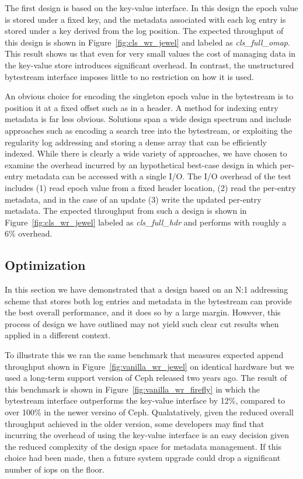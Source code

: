 \documentclass[10pt,twocolumn]{article}
\begin{document}
The first design is based on the key-value interface. In this design the epoch
value is stored under a fixed key, and the metadata associated with each log
entry is stored under a key derived from the log position. The expected throughput of
this design is shown in Figure~\ref{fig:cls_wr_jewel} and labeled as
\emph{cls\_full\_omap}. This result shows us that even for very small values
the cost of managing data in the key-value store introduces significant
overhead. In contrast, the unstructured bytestream interface imposes little
to no restriction on how it is used.

An obvious choice for encoding the singleton epoch value in the bytestream is
to position it at a fixed offset such as in a header. A method for indexing
entry metadata is far less obvious. Solutions span a wide design spectrum and
include approaches such as encoding a search tree into the bytestream, or
exploiting the regularity log addressing and storing a dense array that can be
efficiently indexed. While there is clearly a wide variety of approaches, we
have chosen to examine the overhead incurred by an hypothetical best-case
design in which per-entry metadata can be accessed with a single I/O. The I/O
overhead of the test includes (1) read epoch value from a fixed header
location, (2) read the per-entry metadata, and in the case of an update (3)
write the updated per-entry metadata. The expected throughput from such a
design is shown in Figure~\ref{fig:cls_wr_jewel} labeled as
\emph{cls\_full\_hdr} and performs with roughly a 6\% overhead.

\subsection{Optimization}

In this section we have demonstrated that a design based on an N:1 addressing
scheme that stores both log entries and metadata in the bytestream can provide
the best overall performance, and it does so by a large margin. However, this
process of design we have outlined may not yield such clear cut results when
applied in a different context.

To illustrate this we ran the same benchmark that measures expected append
throughput shown in Figure~\ref{fig:vanilla_wr_jewel} on identical hardware
but we used a long-term support version of Ceph released two years
ago. The result of this benchmark is shown in Figure~\ref{fig:vanilla_wr_firefly}
in which the bytestream interface outperforms the key-value interface by 12\%,
compared to over 100\% in the newer versino of Ceph. Qualatatively, given the
reduced overall throughput achieved in the older version, some developers may
find that incurring the overhead of using the key-value interface is an easy
decision given the reduced complexity of the design space for metadata
management. If this choice had been made, then a future system upgrade could
drop a significant number of iops on the floor.
\end{document}
